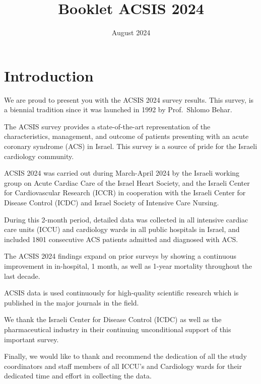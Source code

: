 \documentclass[
]{article}
\title{Booklet ACSIS 2024}
\author{}
\date{\vspace{-2.5em}August 2024}
\begin{document}
\maketitle

{
\setcounter{tocdepth}{2}
\tableofcontents
}
\captionsetup[table]{labelformat=empty}

\pagebreak

\section{Introduction}\label{introduction}

We are proud to present you with the ACSIS 2024 survey results. This
survey, is a biennial tradition since it was launched in 1992 by
Prof.~Shlomo Behar.

The ACSIS survey provides a state-of-the-art representation of the
characteristics, management, and outcome of patients presenting with an
acute coronary syndrome (ACS) in Israel. This survey is a source of
pride for the Israeli cardiology community.

ACSIS 2024 was carried out during March-April 2024 by the Israeli
working group on Acute Cardiac Care of the Israel Heart Society, and the
Israeli Center for Cardiovascular Research (ICCR) in cooperation with
the Israeli Center for Disease Control (ICDC) and Israel Society of
Intensive Care Nursing.

During this 2-month period, detailed data was collected in all intensive
cardiac care units (ICCU) and cardiology wards in all public hospitals
in Israel, and included 1801 consecutive ACS patients admitted and
diagnosed with ACS.

The ACSIS 2024 findings expand on prior surveys by showing a continuous
improvement in in-hospital, 1 month, as well as 1-year mortality
throughout the last decade.

ACSIS data is used continuously for high-quality scientific research
which is published in the major journals in the field.

We thank the Israeli Center for Disease Control (ICDC) as well as the
pharmaceutical industry in their continuing unconditional support of
this important survey.

Finally, we would like to thank and recommend the dedication of all the
study coordinators and staff members of all ICCU's and Cardiology wards
for their dedicated time and effort in collecting the data.

~

~
\end{document}
